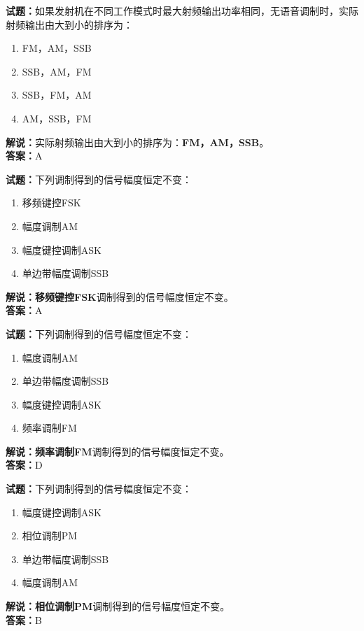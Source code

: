 \documentclass{ctexbook}
\begin{document}
\bigskip


\noindent\textbf{试题：}如果发射机在不同工作模式时最大射频输出功率相同，无语音调制时，实际射频输出由大到小的排序为：
\begin{enumerate}[leftmargin=3em]
\item FM，AM，SSB
\item SSB，AM，FM
\item SSB，FM，AM
\item AM，SSB，FM
\end{enumerate}
\noindent\textbf{解说：}实际射频输出由大到小的排序为：\textbf{FM，AM，SSB}。\\\noindent\textbf{答案：}A




\bigskip


\noindent\textbf{试题：}下列调制得到的信号幅度恒定不变：
\begin{enumerate}[leftmargin=3em]
\item 移频键控FSK
\item 幅度调制AM
\item 幅度键控调制ASK
\item 单边带幅度调制SSB
\end{enumerate}
\noindent\textbf{解说：}\textbf{移频键控FSK}调制得到的信号幅度恒定不变。\\\noindent\textbf{答案：}A




\bigskip


\noindent\textbf{试题：}下列调制得到的信号幅度恒定不变：
\begin{enumerate}[leftmargin=3em]
\item 幅度调制AM
\item 单边带幅度调制SSB
\item 幅度键控调制ASK
\item 频率调制FM
\end{enumerate}
\noindent\textbf{解说：}\textbf{频率调制FM}调制得到的信号幅度恒定不变。\\\noindent\textbf{答案：}D




\bigskip


\noindent\textbf{试题：}下列调制得到的信号幅度恒定不变：
\begin{enumerate}[leftmargin=3em]
\item 幅度键控调制ASK
\item 相位调制PM
\item 单边带幅度调制SSB
\item 幅度调制AM
\end{enumerate}
\noindent\textbf{解说：}\textbf{相位调制PM}调制得到的信号幅度恒定不变。\\\noindent\textbf{答案：}B
\end{document}
